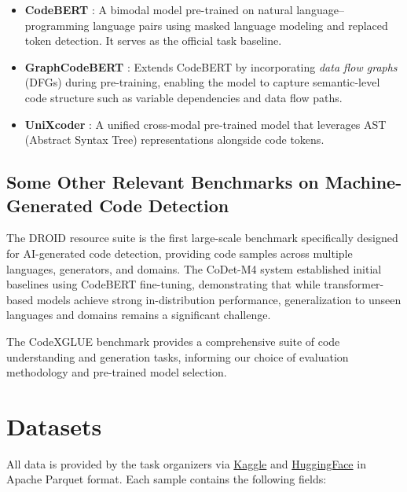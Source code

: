 \documentclass[11pt]{article}
\begin{document}
\begin{itemize}
    \item \textbf{CodeBERT} \cite{feng-etal-2020-codebert}: A bimodal model pre-trained on natural language--programming language pairs using masked language modeling and replaced token detection. It serves as the official task baseline.
    \item \textbf{GraphCodeBERT} \cite{guo2021graphcodebert}: Extends CodeBERT by incorporating \textit{data flow graphs} (DFGs) during pre-training, enabling the model to capture semantic-level code structure such as variable dependencies and data flow paths.
    \item \textbf{UniXcoder} \cite{guo2022unixcoder}: A unified cross-modal pre-trained model that leverages AST (Abstract Syntax Tree) representations alongside code tokens.
\end{itemize}

\subsection{Some Other Relevant Benchmarks on Machine-Generated Code Detection}

The DROID resource suite \cite{orel2025droid} is the first large-scale benchmark specifically designed for AI-generated code detection, providing code samples across multiple languages, generators, and domains. The CoDet-M4 system \cite{orel-etal-2025-codet} established initial baselines using CodeBERT fine-tuning, demonstrating that while transformer-based models achieve strong in-distribution performance, generalization to unseen languages and domains remains a significant challenge.

The CodeXGLUE benchmark \cite{lu2021codexglue} provides a comprehensive suite of code understanding and generation tasks, informing our choice of evaluation methodology and pre-trained model selection.

\section{Datasets}
\label{sec:datasets}

All data is provided by the task organizers via \href{https://www.kaggle.com/datasets/daniilor/semeval-2026-task13}{Kaggle} and \href{https://huggingface.co/datasets/DaniilOr/SemEval-2026-Task13}{HuggingFace} in Apache Parquet format. Each sample contains the following fields:
\end{document}
